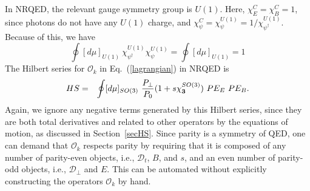 \documentclass[prd,onecolumn, nofootinbib, 11pt]{revtex4}
\begin{document}
In NRQED, the relevant gauge symmetry group is $U(1)$.  Here, $\chi^C_E =\chi^C_B = 1$, since photons do not have any $U(1)$ charge, and $\chi^C_\psi = \chi^{U(1)}_\psi = 1/\chi^{U(1)}_{\psi^\dagger}$.  Because of this, we have
\begin{equation}
 \oint [d\mu]_{U(1)}~ \chi^{U(1)}_{\psi^\dagger} \chi^{U(1)}_\psi =  \oint [d\mu]_{U(1)} =1
\end{equation} 
%
The Hilbert series for $\mathcal{O}_k$ in Eq.~(\ref{lagrangian}) in NRQED is
%
\begin{eqnarray}
HS &=&  \oint [d\mu]_{SO(3)} ~  \frac{P_\perp}{P_0 } (1+s\chi_{\bf 3}^{SO(3)})  ~PE_E ~PE_B  .
\end{eqnarray}
%
Again, we ignore any negative terms generated by this Hilbert series, since they are both total derivatives and related to other operators by the equations of motion, as discussed in Section~\ref{secHS}.  Since parity is a symmetry of QED, one can demand that $\mathcal{O}_k$ respects parity by requiring that it is composed of any number of parity-even objects, i.e., $\mathcal{D}_t$, $B$, and $s$, and an even number of parity-odd objects, i.e., $\mathcal{D}_\perp$ and $E$.  This can be automated without explicitly constructing the operators $\mathcal{O}_k$ by hand. 
\end{document}
